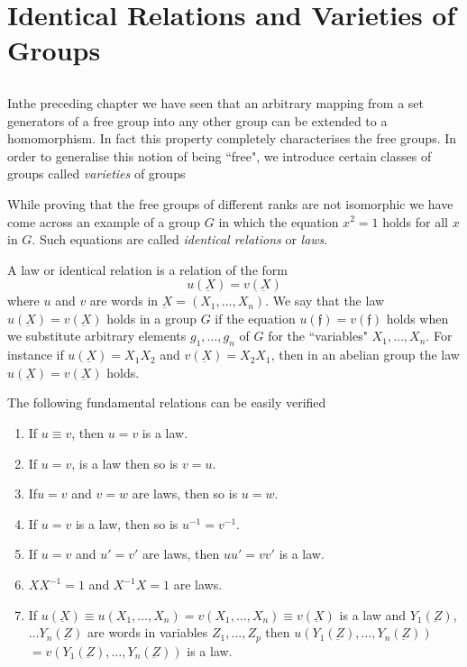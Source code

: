 
\chapter{Identical Relations and Varieties of Groups}\label{chap5} %

\section{}\label{chap5:sec1} %

In\pageoriginale the preceding chapter we have seen that an arbitrary
mapping from a 
set generators of a free group into any other group can be extended to
a homomorphism. In fact this property completely characterises the
free groups. In order to generalise this notion of being ``free", we
introduce certain classes of groups called \textit{varieties} of groups  

While proving that the free groups of different ranks are not
isomorphic we have come across an example of a group $G$ in which the
equation $x^2 =1$ holds for all $x$ in $G$. Such equations are called
\textit{identical relations} or \textit{laws}. 

\begin{defi*}
  A law or identical relation is a relation of the form
  $$
  u (\underbar{X}) = v(\underbar{X})
  $$
  where $u$ and $v$ are words in $\underbar{X} = (X_1, \ldots, 
  X_n)$. We say that the law $u (\underbar{X}) = v(\underbar{X})$
  holds in a group $G$ if the equation $u (\mathfrak{f}) =
  v(\mathfrak{f})$ holds when we substitute arbitrary elements $g_1,
  \ldots,  g_n$ of $G$ for the ``variables" $X_1, \ldots,  X_n$. For
  instance if $u(\underbar{X}) = X_1 X_2$ and $v (\underbar{X})= X_2
  X_1$, then in an abelian group the law $u (\underbar{X}) =
  v(\underbar{X})$ holds.  
  
  The following fundamental relations can be easily verified 
  \begin{enumerate}[\rm (1)]
  \item If $u \equiv v$, then $u = v$ is a law.
  \item If $u = v$, is a law then so is $v= u$.
  \item If\pageoriginale $u = v$ and $v = w$ are laws, then so is $u = w$.
    \item If $u=v$ is a law, then so is $u^{-1}= v^{-1}$.
  \item If $u = v$ and $u' = v'$ are laws, then $uu' = vv'$ is a law.
  \item $XX^{-1} = 1$ and $X^{-1}X =1$ are laws.
  \item If $u (\underbar{X}) \equiv u (X_1, \ldots,  X_n) = v(X_1,
    \ldots,  X_n) \equiv v(\underbar{X}) $ is a law and $Y_1
    (\underbar{Z})$, $\ldots Y_n (\underbar{Z})$ are words in variables
    $Z_1, \ldots,  Z_p$ then $u (Y_1(\underbar{Z}), \ldots ,Y_n
    (\underbar{Z}))$ $= v (Y_1(\underbar{Z}), \ldots,  Y_n
    (\underbar{Z}) )$ is a law. 
  \end{enumerate}
\end{defi*}

